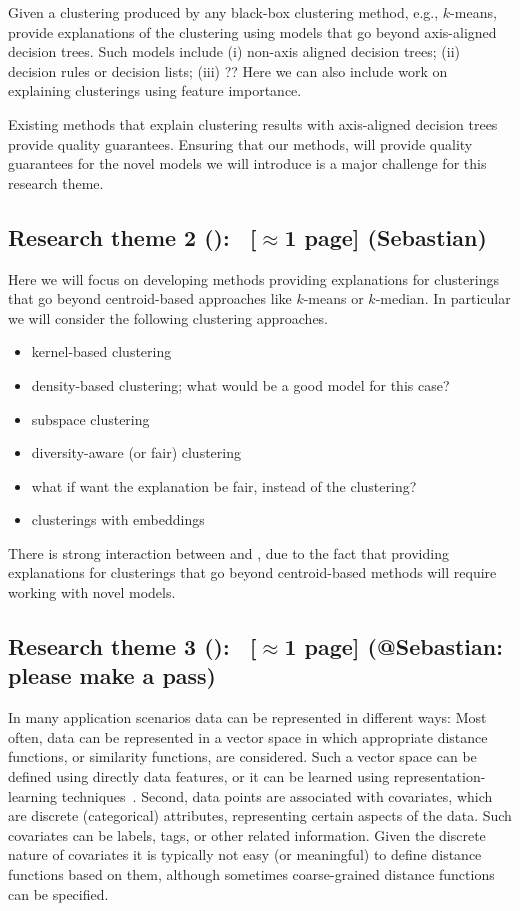 \documentclass[a4paper,11pt]{article}
\begin{document}
Given a clustering produced by any black-box clustering method, e.g., $k$-means,
provide explanations of the clustering using models that go beyond axis-aligned decision trees.
Such models include 
(i) non-axis aligned decision trees;
(ii) decision rules or decision lists;
(iii) ??
Here we can also include work on explaining clusterings using feature importance. 

Existing methods that explain clustering results with axis-aligned decision trees
provide quality guarantees.
Ensuring that our methods, will provide quality guarantees for the novel models
we will introduce is a major challenge for this research theme.

\subsection*{Research theme 2 (\rtw): \clusterings\ {\color{orange}[$\approx$1 page]} {\color{teal}(Sebastian)}}

Here we will focus on developing methods providing explanations for clusterings 
that go beyond centroid-based approaches like $k$-means or $k$-median.
In particular we will consider the following clustering approaches.
\begin{itemize}
\setlength{\itemsep}{-2pt}
\item kernel-based clustering
\item density-based clustering; what would be a good model for this case?
\item subspace clustering \hfill{}
\item diversity-aware (or fair) clustering \hfill{}
\item what if want the explanation be fair, instead of the clustering?
\item clusterings with embeddings
\end{itemize}

There is strong interaction between \rto and \rtw, 
due to the fact that providing explanations for clusterings that go beyond centroid-based methods
will require working with novel models.

\subsection*{Research theme 3 (\rth): \covariates\ {\color{orange}[$\approx$1 page]} {\color{teal}(@Sebastian: please make a pass)}}

In many application scenarios data can be represented in different ways: 
Most often, data can be represented in a vector space
in which appropriate distance functions, or similarity functions, are considered.
Such a vector space can be defined using directly data features, 
or it can be learned using representation-learning techniques~\cite{hamilton2017representation,wang2020survey}.
Second, data points are associated with covariates, 
which are discrete (categorical) attributes, 
representing certain aspects of the data. 
Such covariates can be labels, tags, or other related information.
Given the discrete nature of covariates it is typically not easy (or meaningful)
to define distance functions based on them, 
although sometimes coarse-grained distance functions can be specified.
\end{document}
